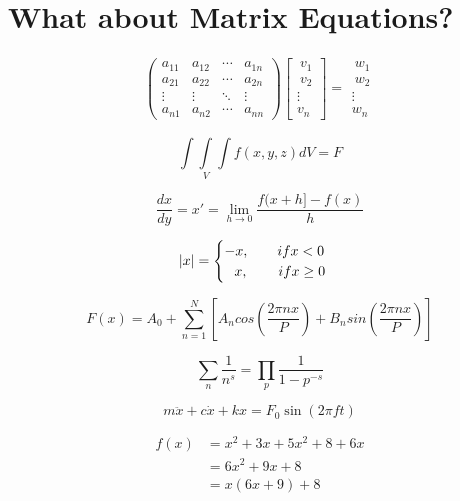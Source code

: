 \documentclass{article}
\begin{document}
\section{What about Matrix Equations?}
\begin{gather*}\begin{pmatrix}
    a_{11} &  a_{12} & \cdots & a_{1n} \\
    a_{21} &  a_{22} & \cdots & a_{2n} \\
    \vdots &  \vdots & \ddots & \vdots \\
    a_{n1} &  a_{n2} & \cdots & a_{nn}
\end{pmatrix}\begin{bmatrix}
    \ v_{1} \\[0.3em]
    \ v_{2} \\[0.3em]
    \vdots \\[0.3em]
    v_{n}
\end{bmatrix} = \begin{matrix}
    \ w_{1} \\
    \ w_{2} \\
    \vdots \\
    w_{n}
\end{matrix}
\end{gather*}

\clearpage
\[\int\int\limits_V\int f(x, y, z)dV = F\]

\[\frac{dx}{dy} = x' = \lim_{h \to 0}\frac{f(x+h]-f(x)}{h}\]

$$|x|=
\begin{cases}
     -x,\hspace{0.70cm} if x<0\\
    \hspace{0.25cm} x,\hspace{0.75cm} if x\geq 0
\end{cases}$$

\[F(x) = A_0 + \sum_{n=1}^{N}\left[A_n cos \left(\frac{2\pi nx}{P}\right)+B_n sin\left(\frac{2\pi nx}{P}\right)\right]\]

\[ \sum_{n} \frac{1}{n^s} = \prod_p \frac{1}{1 - p^{-s}} \]

\[m\ddot{x}+c\dot{x}+kx=F_{0}\sin(2\pi ft)\]

\begin{equation*}
\begin{split}
f(x)& = x^2+3x+5x^2+8+6x\\
 &= 6x^2+9x+8\\
 &=x(6x+9)+8
\end{split}
\end{equation*}
\end{document}

